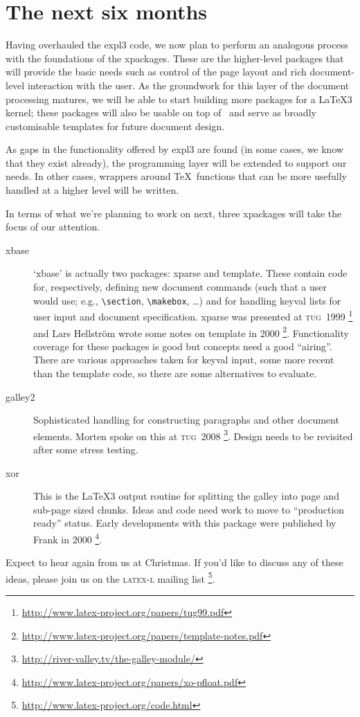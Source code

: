 \documentclass{ltnews}
\newcommand\TUG[1]{\textsc{tug}~#1}
\begin{document}
\section{The next six months}

Having overhauled the \textsf{expl3} code, we now plan to perform an
analogous process with the foundations of the
\textsf{xpackages}. These are the higher-level packages that will
provide the basic needs such as control of the page layout and rich
document-level interaction with the user. As the groundwork for this
layer of the document processing matures, we will be able to start
building more packages for a \LaTeX3 kernel; these packages will also
be usable on top of \LaTeXe\ and serve as broadly customisable
templates for future document design.

As gaps in the functionality offered by \textsf{expl3} are found (in
some cases, we know that they exist already), the programming layer
will be extended to support our needs. In other cases, wrappers around
\TeX\ functions that can be more usefully handled at a higher level
will be written.

In terms of what we're planning to work on next, three \textsf{xpackage}s
will take the focus of our attention.
\begin{description}
\item [xbase]
  `\textsf{xbase}' is actually two packages: \textsf{xparse} and
  \textsf{template}. These contain code for, respectively, defining new
  document commands (such that a user would use; e.g., \verb|\section|,
  \verb|\makebox|, \dots) and for handling keyval lists for user input and
  document specification. \textsf{xparse} was presented at \TUG{1999}%
  \footnote{\url{http://www.latex-project.org/papers/tug99.pdf}}
  and Lars Hellstr\"om wrote some notes on \textsf{template} in 2000%
  \footnote{\url{http://www.latex-project.org/papers/template-notes.pdf}}.
  Functionality coverage for these packages is good but concepts need a good
  ``airing''. There are various approaches taken for keyval input, some more
  recent than the \textsf{template} code, so there are some alternatives to
  evaluate.
\item [galley2] Sophisticated handling for \mbox{constructing} paragraphs and
  other document elements. Morten spoke on this at \TUG{2008}%
  \footnote{\url{http://river-valley.tv/the-galley-module/}}.
  Design needs to be revisited after some stress testing.
\item [xor] This is the \LaTeX3 output routine for splitting the galley into
  page and sub-page sized chunks. Ideas and code need work to move to
  ``production ready'' status. Early developments with this package were
  published by Frank in 2000%
  \footnote{\url{http://www.latex-project.org/papers/xo-pfloat.pdf}}.
\end{description}

Expect to hear again from us at Christmas. If you'd like to discuss any
of these ideas, please join us on the \textsc{latex-l} mailing list%
\footnote{\url{http://www.latex-project.org/code.html}}.
\end{document}
